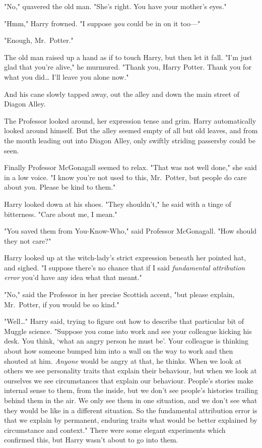 "No," quavered the old man. "She's right. You have your mother's eyes."

"Hmm," Harry frowned. "I suppose \emph{you} could be in on it too---"

"Enough, Mr.~Potter."

The old man raised up a hand as if to touch Harry, but then let it fall. "I'm
just glad that you're alive," he murmured. "Thank you, Harry Potter. Thank you
for what you did{\ldots} I'll leave you alone now."

And his cane slowly tapped away, out the alley and down the main street of
Diagon Alley.

The Professor looked around, her expression tense and grim. Harry automatically
looked around himself. But the alley seemed empty of all but old leaves, and
from the mouth leading out into Diagon Alley, only swiftly striding passersby
could be seen.

Finally Professor McGonagall seemed to relax. "That was not well done," she
said in a low voice. "I know you're not used to this, Mr.~Potter, but people do
care about you. Please be kind to them."

Harry looked down at his shoes. "They shouldn't," he said with a tinge of
bitterness. "Care about me, I mean."

"You saved them from You-Know-Who," said Professor McGonagall. "How should they
not care?"

Harry looked up at the witch-lady's strict expression beneath her pointed hat,
and sighed. "I suppose there's no chance that if I said \emph{fundamental
attribution error} you'd have any idea what that meant."

"No," said the Professor in her precise Scottish accent, "but please explain,
Mr.~Potter, if you would be so kind."

"Well{\ldots}" Harry said, trying to figure out how to describe that particular
bit of Muggle science. "Suppose you come into work and see your colleague
kicking his desk. You think, `what an angry person he must be'. Your colleague
is thinking about how someone bumped him into a wall on the way to work and
then shouted at him. \emph{Anyone} would be angry at that, he thinks. When we
look at others we see personality traits that explain their behaviour, but when
we look at ourselves we see circumstances that explain our behaviour. People's
stories make internal sense to them, from the inside, but we don't see people's
histories trailing behind them in the air. We only see them in one situation,
and we don't see what they would be like in a different situation. So the
fundamental attribution error is that we explain by permanent, enduring traits
what would be better explained by circumstance and context." There were some
elegant experiments which confirmed this, but Harry wasn't about to go into
them.

